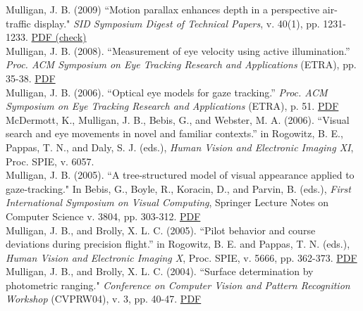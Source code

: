 \documentclass[12pt]{article}
\newcommand{\years}[1]{\marginnote{\scriptsize #1}}
\begin{document}
Mulligan, J. B. (2009)
``Motion parallax enhances depth in a perspective air-traffic display."
\emph{SID Symposium Digest of Technical Papers}, v. 40(1), pp. 1231-1233.  \href{https://hsi.arc.nasa.gov/publications/mulligan_sid09.pdf}{PDF (check)}\\

\years{2008}
Mulligan, J. B. (2008).
``Measurement of eye velocity using active illumination.”
\emph{Proc. ACM Symposium on Eye Tracking Research and Applications} (ETRA),
pp. 35-38.  \href{https://hsi.arc.nasa.gov/publications/mulligan_etra08.pdf}{PDF}\\

\years{2006}
Mulligan, J. B. (2006).
``Optical eye models for gaze tracking.”
\emph{Proc. ACM Symposium on Eye Tracking Research and Applications} (ETRA), p. 51.  \href{https://hsi.arc.nasa.gov/publications/mulligan_etra06.pdf}{PDF}\\

McDermott, K., Mulligan, J. B., Bebis, G., and Webster, M. A. (2006).
``Visual search and eye movements in novel and familiar contexts.”
in Rogowitz, B. E., Pappas, T. N., and Daly, S. J. (eds.),
\emph{Human Vision and Electronic Imaging XI},
Proc. SPIE, v. 6057.\\

\years{2005}
Mulligan, J. B. (2005).
``A tree-structured model of visual appearance applied to gaze-tracking."
In Bebis, G., Boyle, R., Koracin, D., and Parvin, B. (eds.),
\emph{First International Symposium on Visual Computing},
Springer Lecture Notes on Computer Science v. 3804, pp. 303-312.  \href{https://hsi.arc.nasa.gov/publications/mulligan_isvc05.pdf}{PDF}\\

\clearpage
Mulligan, J. B., and Brolly, X. L. C. (2005).
``Pilot behavior and course deviations during precision flight.”
in Rogowitz, B. E. and Pappas, T. N. (eds.),
\emph{Human Vision and Electronic Imaging X},
Proc. SPIE, v. 5666,
pp. 362-373.  \href{https://hsi.arc.nasa.gov/publications/mulligan_spie05.pdf}{PDF}\\

\years{2004}
Mulligan, J. B., and Brolly, X. L. C. (2004).
``Surface determination by photometric ranging."
\emph{Conference on Computer Vision and Pattern Recognition Workshop} (CVPRW04),
v. 3, pp. 40-47.  \href{https://hsi.arc.nasa.gov/publications/Mulligan_Brolly_ranging.pdf}{PDF}\\
\end{document}
